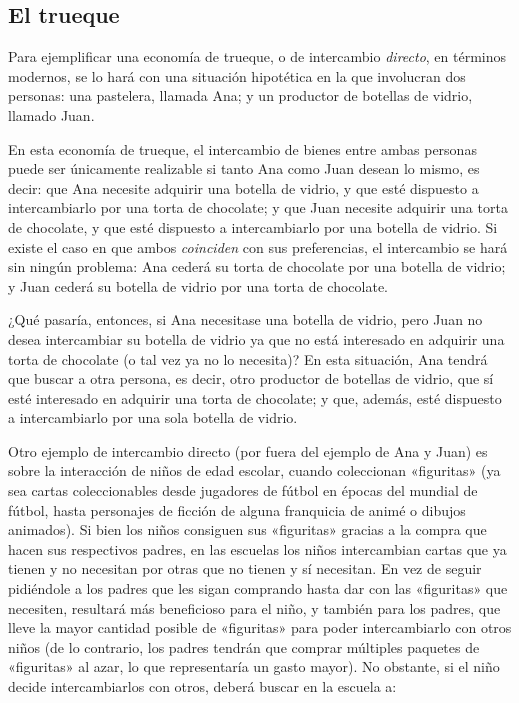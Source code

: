 \documentclass[12pt,a4paper,twoside]{book}
\begin{document}
\subsection{El trueque}
Para ejemplificar una economía de trueque, o de intercambio \textit{directo}, en términos modernos, se lo hará con una situación hipotética en la que involucran dos personas: una pastelera, llamada Ana; y un productor de botellas de vidrio, llamado Juan.

En esta economía de trueque, el intercambio de bienes entre ambas personas puede ser únicamente realizable si tanto Ana como Juan desean lo mismo, es decir: que Ana necesite adquirir una botella de vidrio, y que esté dispuesto a intercambiarlo por una torta de chocolate; y que Juan necesite adquirir una torta de chocolate, y que esté dispuesto a intercambiarlo por una botella de vidrio. Si existe el caso en que ambos \textit{coinciden} con sus preferencias, el intercambio se hará sin ningún problema: Ana cederá su torta de chocolate por una botella de vidrio; y Juan cederá su botella de vidrio por una torta de chocolate.

¿Qué pasaría, entonces, si Ana necesitase una botella de vidrio, pero Juan no desea intercambiar su botella de vidrio ya que no está interesado en adquirir una torta de chocolate (o tal vez ya no lo necesita)? En esta situación, Ana tendrá que buscar a otra persona, es decir, otro productor de botellas de vidrio, que sí esté interesado en adquirir una torta de chocolate; y que, además, esté dispuesto a intercambiarlo por una sola botella de vidrio.

Otro ejemplo de intercambio directo (por fuera del ejemplo de Ana y Juan) es sobre la interacción de niños de edad escolar, cuando coleccionan «figuritas» (ya sea cartas coleccionables desde jugadores de fútbol en épocas del mundial de fútbol, hasta personajes de ficción de alguna franquicia de animé o dibujos animados). Si bien los niños consiguen sus «figuritas» gracias a la compra que hacen sus respectivos padres, en las escuelas los niños intercambian cartas que ya tienen y no necesitan por otras que no tienen y sí necesitan. En vez de seguir pidiéndole a los padres que les sigan comprando hasta dar con las «figuritas» que necesiten, resultará más beneficioso para el niño, y también para los padres, que lleve la mayor cantidad posible de «figuritas» para poder intercambiarlo con otros niños (de lo contrario, los padres tendrán que comprar múltiples paquetes de «figuritas» al azar, lo que representaría un gasto mayor). No obstante, si el niño decide intercambiarlos con otros, deberá buscar en la escuela a:
\end{document}
